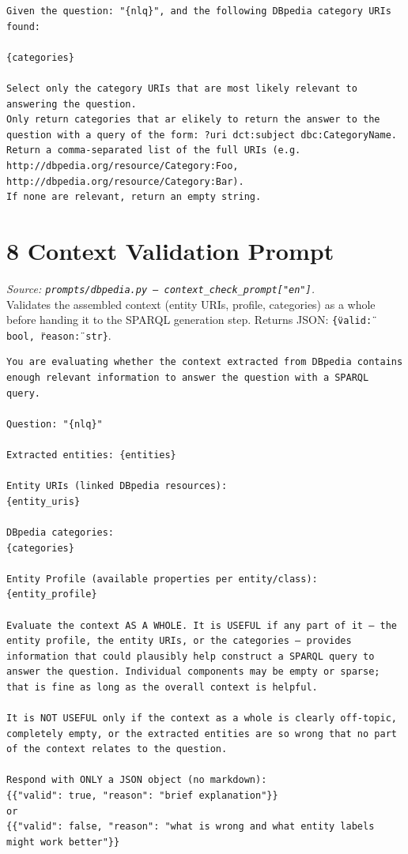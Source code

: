 \documentclass[11pt,a4paper]{article}
\begin{document}
\begin{lstlisting}[style=prompt]
Given the question: "{nlq}", and the following DBpedia category URIs found:

{categories}

Select only the category URIs that are most likely relevant to answering the question.
Only return categories that ar elikely to return the answer to the question with a query of the form: ?uri dct:subject dbc:CategoryName.
Return a comma-separated list of the full URIs (e.g. http://dbpedia.org/resource/Category:Foo, http://dbpedia.org/resource/Category:Bar).
If none are relevant, return an empty string.
\end{lstlisting}

\section{8 \quad Context Validation Prompt}
\textit{Source: \texttt{prompts/dbpedia.py --- context\_check\_prompt["en"]}.}\\
Validates the assembled context (entity URIs, profile, categories) as a whole before handing it to the SPARQL generation step. Returns JSON: \texttt{\{\"valid\": bool, \"reason\": str\}}.

\begin{lstlisting}[style=prompt]
You are evaluating whether the context extracted from DBpedia contains enough relevant information to answer the question with a SPARQL query.

Question: "{nlq}"

Extracted entities: {entities}

Entity URIs (linked DBpedia resources):
{entity_uris}

DBpedia categories:
{categories}

Entity Profile (available properties per entity/class):
{entity_profile}

Evaluate the context AS A WHOLE. It is USEFUL if any part of it — the entity profile, the entity URIs, or the categories — provides information that could plausibly help construct a SPARQL query to answer the question. Individual components may be empty or sparse; that is fine as long as the overall context is helpful.

It is NOT USEFUL only if the context as a whole is clearly off-topic, completely empty, or the extracted entities are so wrong that no part of the context relates to the question.

Respond with ONLY a JSON object (no markdown):
{{"valid": true, "reason": "brief explanation"}}
or
{{"valid": false, "reason": "what is wrong and what entity labels might work better"}}
\end{lstlisting}
\end{document}
